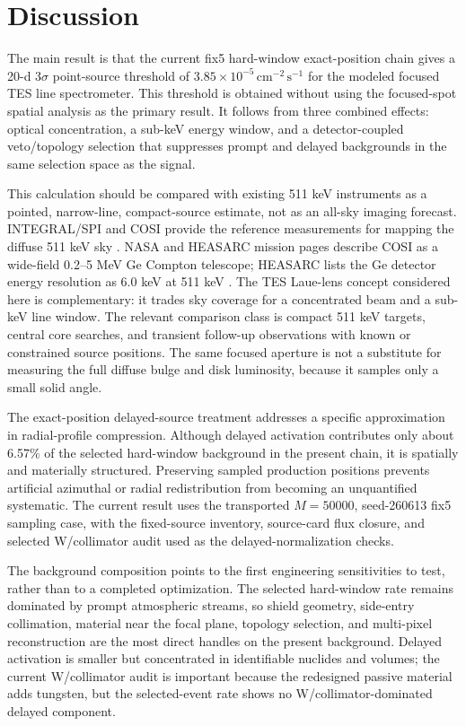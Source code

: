 \documentclass[preprint,12pt]{elsarticle}
\newcommand{\cms}{\,\mathrm{cm^{-2}\,s^{-1}}}
\begin{document}
\section{Discussion}
\label{sec:discussion}

The main result is that the current fix5 hard-window exact-position chain gives a 20-d $3\sigma$ point-source threshold of $3.85\times10^{-5}\cms$ for the modeled focused TES line spectrometer. This threshold is obtained without using the focused-spot spatial analysis as the primary result. It follows from three combined effects: optical concentration, a sub-keV energy window, and a detector-coupled veto/topology selection that suppresses prompt and delayed backgrounds in the same selection space as the signal.

This calculation should be compared with existing 511 keV instruments as a pointed, narrow-line, compact-source estimate, not as an all-sky imaging forecast. INTEGRAL/SPI and COSI provide the reference measurements for mapping the diffuse 511 keV sky \cite{Siegert2016AA,Kierans2020,Siegert2020COSI,Yoneda2025}. NASA and HEASARC mission pages describe COSI as a wide-field 0.2--5 MeV Ge Compton telescope; HEASARC lists the Ge detector energy resolution as 6.0 keV at 511 keV \cite{NASACOSI,HEASARCCOSI}. The TES Laue-lens concept considered here is complementary: it trades sky coverage for a concentrated beam and a sub-keV line window. The relevant comparison class is compact 511 keV targets, central core searches, and transient follow-up observations with known or constrained source positions. The same focused aperture is not a substitute for measuring the full diffuse bulge and disk luminosity, because it samples only a small solid angle.

The exact-position delayed-source treatment addresses a specific approximation in radial-profile compression. Although delayed activation contributes only about 6.57\% of the selected hard-window background in the present chain, it is spatially and materially structured. Preserving sampled production positions prevents artificial azimuthal or radial redistribution from becoming an unquantified systematic. The current result uses the transported $M=50000$, seed-260613 fix5 sampling case, with the fixed-source inventory, source-card flux closure, and selected W/collimator audit used as the delayed-normalization checks.

The background composition points to the first engineering sensitivities to test, rather than to a completed optimization. The selected hard-window rate remains dominated by prompt atmospheric streams, so shield geometry, side-entry collimation, material near the focal plane, topology selection, and multi-pixel reconstruction are the most direct handles on the present background. Delayed activation is smaller but concentrated in identifiable nuclides and volumes; the current W/collimator audit is important because the redesigned passive material adds tungsten, but the selected-event rate shows no W/collimator-dominated delayed component.
\end{document}
